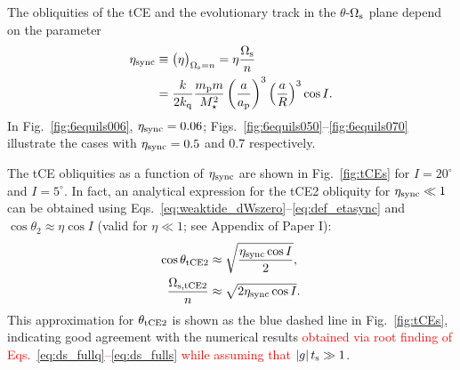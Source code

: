 \documentclass[
        fleqn,
        usenatbib,
        referee
    ]{mnras}
\newcommand*{\abs}[1]{\left|#1\right|}
\newcommand*{\p}[1]{\left(#1\right)}
\begin{document}
The obliquities of the tCE and the evolutionary track in the
$\theta$-$\Omega_{\rm s}$ plane depend on the parameter
\begin{align}
    \eta_{\rm sync} &\equiv \big(\eta\big)_{\Omega_{\rm s} = n}
        = \eta \frac{\Omega_{\rm s}}{n}\nonumber\\
        &= \frac{k}{2k_{\rm q}}
            \frac{m_{\rm p}m}{M_\star^2}
            \p{\frac{a}{a_{\rm p}}}^3 \p{\frac{a}{R}}^3\cos I.
            \label{eq:def_etasync}
\end{align}
In Fig.~\ref{fig:6equils006}, $\eta_{\rm sync} = 0.06$;
Figs.~\ref{fig:6equils050}--\ref{fig:6equils070} illustrate the cases with
$\eta_{\rm sync} = 0.5$ and $0.7$ respectively.

The tCE obliquities as a function of $\eta_{\rm sync}$ are shown in
Fig.~\ref{fig:tCEs} for $I = 20^\circ$ and $I = 5^\circ$. In fact, an analytical
expression for the tCE2 obliquity for $\eta_{\rm sync} \ll 1$ can be obtained
using Eqs.~\eqref{eq:weaktide_dWszero}--\eqref{eq:def_etasync} and $\cos
\theta_2 \approx \eta \cos I$ (valid for $\eta \ll 1$; see Appendix of Paper I):
\begin{align}
    \cos \theta_{\rm tCE2} &\approx \sqrt{\frac{\eta_{\rm sync} \cos I}{2}},
        \\
    \frac{\Omega_{\rm s, tCE2}}{n} &\approx
        \sqrt{2 \eta_{\rm sync}\cos I}. \label{eq:def_tce2_approx}
\end{align}
This approximation for $\theta_{\rm tCE2}$ is shown as the blue dashed line in
Fig.~\ref{fig:tCEs}, indicating good agreement with the numerical results
\textcolor{red}{obtained via root finding of
Eqs.~\eqref{eq:ds_fullq}--\eqref{eq:ds_fulls} while assuming that $\abs{g}t_{\rm
s} \gg 1$}.
\end{document}
